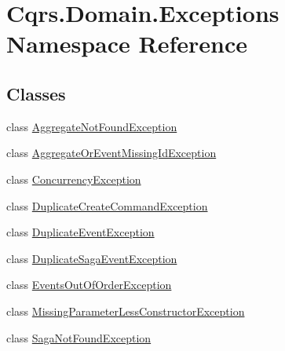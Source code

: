 \hypertarget{namespaceCqrs_1_1Domain_1_1Exceptions}{}\section{Cqrs.\+Domain.\+Exceptions Namespace Reference}
\label{namespaceCqrs_1_1Domain_1_1Exceptions}
\subsection*{Classes}
\begin{DoxyCompactItemize}
\item 
class \hyperlink{classCqrs_1_1Domain_1_1Exceptions_1_1AggregateNotFoundException}{Aggregate\+Not\+Found\+Exception}
\item 
class \hyperlink{classCqrs_1_1Domain_1_1Exceptions_1_1AggregateOrEventMissingIdException}{Aggregate\+Or\+Event\+Missing\+Id\+Exception}
\item 
class \hyperlink{classCqrs_1_1Domain_1_1Exceptions_1_1ConcurrencyException}{Concurrency\+Exception}
\item 
class \hyperlink{classCqrs_1_1Domain_1_1Exceptions_1_1DuplicateCreateCommandException}{Duplicate\+Create\+Command\+Exception}
\item 
class \hyperlink{classCqrs_1_1Domain_1_1Exceptions_1_1DuplicateEventException}{Duplicate\+Event\+Exception}
\item 
class \hyperlink{classCqrs_1_1Domain_1_1Exceptions_1_1DuplicateSagaEventException}{Duplicate\+Saga\+Event\+Exception}
\item 
class \hyperlink{classCqrs_1_1Domain_1_1Exceptions_1_1EventsOutOfOrderException}{Events\+Out\+Of\+Order\+Exception}
\item 
class \hyperlink{classCqrs_1_1Domain_1_1Exceptions_1_1MissingParameterLessConstructorException}{Missing\+Parameter\+Less\+Constructor\+Exception}
\item 
class \hyperlink{classCqrs_1_1Domain_1_1Exceptions_1_1SagaNotFoundException}{Saga\+Not\+Found\+Exception}
\end{DoxyCompactItemize}
